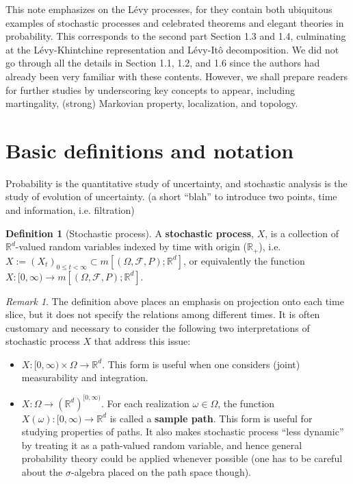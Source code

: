 \documentclass[openany,oneside]{book}
\theoremstyle{definition}
\newtheorem{defn}[thm]{Definition}
\theoremstyle{remark}
\newtheorem{rem}[thm]{Remark}
\newcommand{\R}{{\mathbb R}}%
\begin{document}
This note emphasizes on the L\'evy processes, for they contain both ubiquitous examples of stochastic processes and celebrated theorems and elegant theories in probability. This corresponds to the second part Section 1.3 and 1.4, culminating at the L\'evy-Khintchine representation and L\'evy-It\^o decomposition.  We did not go through all the details in Section 1.1, 1.2, and 1.6 since the authors had already been very familiar with these contents. However, we shall prepare readers for further studies by underscoring key concepts to appear, including martingality, (strong) Markovian property, localization, and topology.


\section{Basic definitions and notation}
Probability is the quantitative study of uncertainty, and stochastic analysis is the study of evolution of uncertainty. {\color{red}(a short ``blah'' to introduce two points, time and information, i.e. filtration)}

\begin{defn}[Stochastic process]
A \textbf{stochastic process}, $X$, is a collection of $\R^d$-valued random variables indexed by time with origin ($\R_+$), i.e. $X:=(X_t)_{0\leq t<\infty}\subset m[(\Omega,\mathcal{F},P);\R^d]$, or equivalently the function $X:[0,\infty) \to m[(\Omega,\mathcal{F},P);\R^d]$.
\end{defn}

\begin{rem}
The definition above places an emphasis on projection onto each time slice, but it does not specify the relations among different times. It is often customary and necessary to consider the following two interpretations of stochastic process $X$ that address this issue:
\begin{itemize}
\item $X:[0,\infty)\times\Omega \to \R^d$. This form is useful when one considers (joint) measurability and integration.
\item $X:\Omega \to {(\R^d)}^{[0,\infty)}$. For each realization $\omega\in \Omega$, the function $X(\omega):[0,\infty) \to \R^d$ is called a \textbf{sample path}. This form is useful for studying properties of paths. It also makes stochastic process ``less dynamic'' by treating it as a path-valued random variable, and hence general probability theory could be applied whenever possible (one has to be careful about the $\sigma$-algebra placed on the path space though). 
\end{itemize}
\end{rem}
\end{document}
